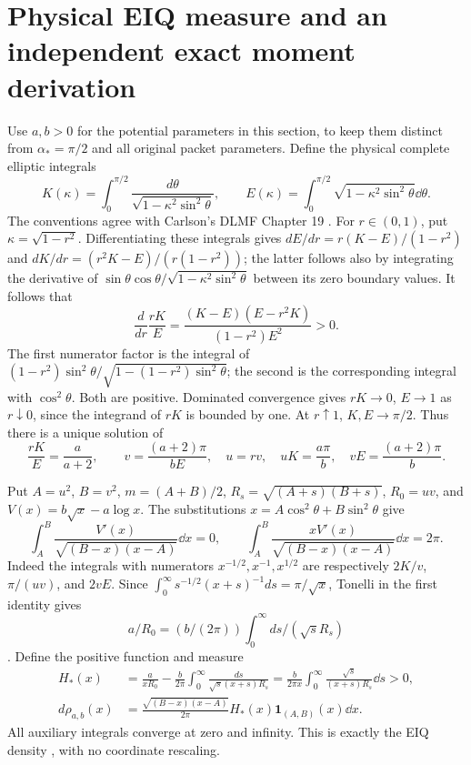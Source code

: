 \documentclass[11pt,a4paper]{article}
\begin{document}
\section{Physical EIQ measure and an independent exact moment derivation}
\label{a02ts:eqphysical}
Use $a,b>0$ for the potential parameters in this section, to keep them
distinct from $\alpha_*=\pi/2$ and all original packet parameters.
Define the physical complete elliptic integrals
\[
 K(\kappa)=\int_0^{\pi/2}\frac{d\theta}{\sqrt{1-\kappa^2\sin^2\theta}},
 \qquad E(\kappa)=\int_0^{\pi/2}\sqrt{1-\kappa^2\sin^2\theta}\dd\theta.
\]
The conventions agree with Carlson's DLMF Chapter 19 \cite{a02ts:elliptic}.
For $r\in(0,1)$, put $\kappa=\sqrt{1-r^2}$. Differentiating these
integrals gives $dE/dr=r(K-E)/(1-r^2)$ and
$dK/dr=(r^2K-E)/(r(1-r^2))$; the latter follows also by integrating
the derivative of $\sin\theta\cos\theta/
\sqrt{1-\kappa^2\sin^2\theta}$ between its zero boundary values.
It follows that
\begin{equation}\tag{TS21}
 \frac d{dr}\frac{rK}{E}
 =\frac{(K-E)(E-r^2K)}{(1-r^2)E^2}>0.
\end{equation}
The first numerator factor is the integral of
$(1-r^2)\sin^2\theta/\sqrt{1-(1-r^2)\sin^2\theta}$;
the second is the corresponding integral with $\cos^2\theta$.
Both are positive. Dominated convergence gives $rK\to0$, $E\to1$
as $r\downarrow0$, since the integrand of $rK$ is bounded by one.
At $r\uparrow1$, $K,E\to\pi/2$. Thus there is a unique solution of
\begin{equation}\tag{TS22}
 \frac{rK}{E}=\frac a{a+2},\qquad
 v=\frac{(a+2)\pi}{bE},\quad u=rv,
 \quad uK=\frac{a\pi}{b},\quad vE=\frac{(a+2)\pi}{b}.
\end{equation}

Put $A=u^2$, $B=v^2$, $m=(A+B)/2$, $R_s=\sqrt{(A+s)(B+s)}$,
$R_0=uv$, and $V(x)=b\sqrt x-a\log x$.
The substitutions $x=A\cos^2\theta+B\sin^2\theta$ give
\[
 \int_A^B\frac{V'(x)}{\sqrt{(B-x)(x-A)}}\dd x=0,\qquad
 \int_A^B\frac{xV'(x)}{\sqrt{(B-x)(x-A)}}\dd x=2\pi.
\]
Indeed the integrals with numerators $x^{-1/2},x^{-1},x^{1/2}$
are respectively $2K/v$, $\pi/(uv)$, and $2vE$.
Since $\int_0^\infty s^{-1/2}(x+s)^{-1}ds=\pi/\sqrt x$,
Tonelli in the first identity gives
\[a/R_0=(b/(2\pi))\int_0^\infty ds/(\sqrt sR_s)\].
Define the positive function and measure
\begin{equation}\tag{TS23}\begin{aligned}
 H_*(x)&=\frac{a}{xR_0}-\frac b{2\pi}\int_0^\infty
           \frac{ds}{\sqrt s(x+s)R_s}
 =\frac b{2\pi x}\int_0^\infty\frac{\sqrt s}{(x+s)R_s}\dd s>0,\\
 d\rho_{a,b}(x)&=\frac{\sqrt{(B-x)(x-A)}}{2\pi}H_*(x)
                 \mathbf1_{(A,B)}(x)\dd x.
\end{aligned}\end{equation}
All auxiliary integrals converge at zero and infinity. This is exactly
the EIQ density \cite{a02ts:EIQ}, with no coordinate rescaling.
\end{document}

